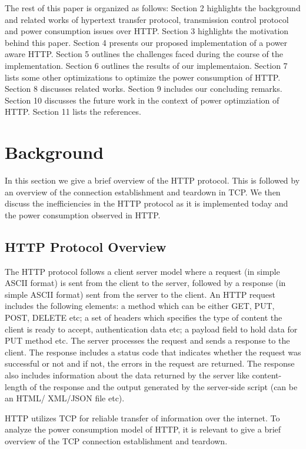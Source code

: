 \documentclass[9pt]{sigplan-proc-varsize}
\begin{document}
The rest of this paper is organized as follows: Section 2 highlights the background and related works of hypertext transfer protocol, transmission control protocol and power consumption issues over HTTP. Section 3 highlights the motivation behind this paper. Section 4 presents our proposed implementation of a power aware HTTP. Section 5 outlines the challenges faced during the course of the implementation. Section 6 outlines the results of our implementaion. Section 7 lists some other optimizations to optimize the power consumption of HTTP. Section 8 discusses related works. Section 9 includes our concluding remarks. Section 10 discusses the future work in the context of power optimziation of HTTP. Section 11 lists the references.

\medskip

\section{Background}

\medskip

In this section we give a brief overview of the HTTP protocol. This is followed by an overview of the connection establishment and teardown in TCP. We then discuss the inefficiencies in the HTTP protocol as it is implemented today and the power consumption observed in HTTP.

\subsection{HTTP Protocol Overview}

The HTTP protocol follows a client server model where a request (in simple ASCII format) is sent from the client to the server, followed by a response (in simple ASCII format) sent from the server to the client. An HTTP request includes the following elements: a method which can be either GET, PUT, POST, DELETE etc; a set of headers which specifies the type of content the client is ready to accept, authentication data etc; a payload field to hold data for PUT method etc. The server processes the request and sends a response to the client. The response includes a status code that indicates whether the request was successful or not and if not, the errors in the request are returned. The response also includes information about the data returned by the server like content-length of the response and the output generated by the server-side script (can be an HTML/ XML/JSON file etc). 

HTTP utilizes TCP for reliable transfer of information over the internet. To analyze the power consumption model of HTTP, it is relevant to give a brief overview of the TCP connection establishment and teardown.
\end{document}
